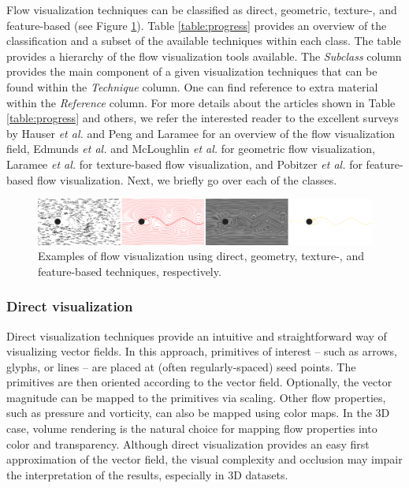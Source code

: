 Flow visualization techniques can be classified as direct, geometric, texture-, and feature-based (see Figure \ref{fig:classes}). 
%
Table \ref{table:progress} provides an overview of the classification and a subset of the available techniques within each class.  
%
The table provides a hierarchy of the flow visualization tools available.
%
The \emph{Subclass} column provides the main component of a given visualization techniques that can be found within the \emph{Technique} column.
%
One can find reference to extra material within the \emph{Reference} column. 
%
For more details about the articles shown in Table \ref{table:progress} and others, we refer the interested reader to the excellent surveys by Hauser \emph{et al.} \cite{Hauser:2003tm} and Peng and Laramee \cite{peng2009higher} for an overview of the flow visualization field, Edmunds \emph{et al.} \cite{Edmunds2012974} and McLoughlin \emph{et al.} \cite{CGF:CGF1650} for geometric flow visualization, Laramee \emph{et al.} \cite{laramee2004state, laramee2008applications} for texture-based flow visualization, and Pobitzer \emph{et al.} \cite{CGF:CGF1901} for feature-based flow visualization. 
%
Next, we briefly go over each of the classes.


\begin{figure}[b]
\centering
\includegraphics[width=1\linewidth]{chapter6/figures/classes.png}
\caption{Examples of flow visualization using direct, geometry, texture-, and feature-based techniques, respectively.}
\label{fig:classes}
\end{figure}


\subsubsection{Direct visualization} 
%
Direct visualization techniques provide an intuitive and straightforward way of visualizing vector fields. 
%
In this approach, primitives of interest -- such as arrows, glyphs, or lines -- are placed at (often regularly-spaced) seed points. 
%
The primitives are then oriented according to the vector field. 
%
Optionally, the vector magnitude can be mapped to the primitives via scaling. 
%
%
Other flow properties, such as pressure and vorticity, can also be mapped using color maps.
%
In the 3D case, volume rendering \cite{Engel:2004:RVG:1103900.1103929} is the natural choice for mapping flow properties into color and transparency.
%
Although direct visualization provides an easy first approximation of the vector field, the visual complexity and occlusion may impair the interpretation of the results, especially in 3D datasets.

